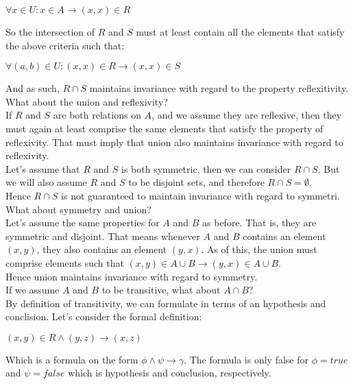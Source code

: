 \documentclass{report}
\newcommand{\cent}[1]{\begin{center}#1\end{center}}
\newcommand{\In}{\! \in \!}
\begin{document}
	\cent{$\forall x \In U : x \in A \to (x,x) \In R $}
	
	So the intersection of $R$ and $S$ must at least contain all the elements that satisfy the above criteria such that:
	
	\cent{$\forall (a,b) \In U : (x,x) \In R \to (x,x) \In S $}
	
	And as such, $R \cap S$ maintains invariance with regard to the property reflexitivity.\\
	
	What about the union and reflexivity?\\
	
	If $R$ and $S$ are both relations on $A$, and we assume they are reflexive, then they must again at least comprise the same elements that satisfy the property of reflexivity. That must imply that union also maintains invariance with regard to reflexivity.\\
	
	Let's assume that $R$ and $S$ is both symmetric, then we can consider $R \cap S$.  But we will also assume $R$ and $S$ to be disjoint sets, and therefore $R \cap S = \emptyset$.\\
	
	Hence $R \cap S$ is not guaranteed to maintain invariance with regard to symmetri.\\
	
	What about symmetry and union?\\
	
	Let's assume the same properties for $A$ and $B$ as before. That is, they are symmetric and disjoint. That means whenever $A$ and $B$ contains an element $(x,y)$, they also contains an element $(y,x)$. As of this, the union must comprise elements such that $(x,y) \In A \cup B \to (y,x) \In A \cup B$.\\ 
	
	Hence union maintains invariance with regard to symmetry.\\
	
	If we assume $A$ and $B$ to be transitive, what about $A \cap B$?\\
	
	By definition of transitivity, we can formulate in terms of an hypothesis and conclision. Let's consider the formal definition:
	
	\cent{$(x,y) \In R \wedge (y,z) \to (x,z)$}
	
	Which is a formula on the form $\phi \wedge \psi \to \gamma$. The formula is only false for $\phi = true$ and $\psi = false$ which is hypothesis and conclusion, respectively.\\
	
\end{document}

